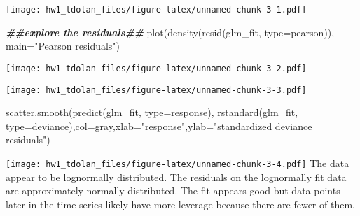 \documentclass[
]{article}
\newenvironment{Shaded}{\begin{snugshade}}{\end{snugshade}}
\newcommand{\AttributeTok}[1]{\textcolor[rgb]{0.77,0.63,0.00}{#1}}
\newcommand{\DocumentationTok}[1]{\textcolor[rgb]{0.56,0.35,0.01}{\textbf{\textit{#1}}}}
\newcommand{\FunctionTok}[1]{\textcolor[rgb]{0.00,0.00,0.00}{#1}}
\newcommand{\NormalTok}[1]{#1}
\newcommand{\SpecialCharTok}[1]{\textcolor[rgb]{0.00,0.00,0.00}{#1}}
\newcommand{\StringTok}[1]{\textcolor[rgb]{0.31,0.60,0.02}{#1}}
\begin{document}
\texttt{[image: hw1\_tdolan\_files/figure-latex/unnamed-chunk-3-1.pdf]}

\begin{Shaded}
\begin{Highlighting}[]
\DocumentationTok{\#\#explore the residuals\#\#}
 \FunctionTok{plot}\NormalTok{(}\FunctionTok{density}\NormalTok{(}\FunctionTok{resid}\NormalTok{(glm\_fit, }\AttributeTok{type=}\StringTok{\textquotesingle{}pearson\textquotesingle{}}\NormalTok{)), }\AttributeTok{main=}\StringTok{"Pearson residuals"}\NormalTok{)}
\end{Highlighting}
\end{Shaded}

\texttt{[image: hw1\_tdolan\_files/figure-latex/unnamed-chunk-3-2.pdf]}

\begin{Shaded}
\end{Shaded}

\texttt{[image: hw1\_tdolan\_files/figure-latex/unnamed-chunk-3-3.pdf]}

\begin{Shaded}
\begin{Highlighting}[]
 \FunctionTok{scatter.smooth}\NormalTok{(}\FunctionTok{predict}\NormalTok{(glm\_fit, }\AttributeTok{type=}\StringTok{\textquotesingle{}response\textquotesingle{}}\NormalTok{), }\FunctionTok{rstandard}\NormalTok{(glm\_fit, }\AttributeTok{type=}\StringTok{\textquotesingle{}deviance\textquotesingle{}}\NormalTok{),}\AttributeTok{col=}\StringTok{\textquotesingle{}gray\textquotesingle{}}\NormalTok{,}\AttributeTok{xlab=}\StringTok{"response"}\NormalTok{,}\AttributeTok{ylab=}\StringTok{"standardized deviance residuals"}\NormalTok{)}
\end{Highlighting}
\end{Shaded}

\texttt{[image: hw1\_tdolan\_files/figure-latex/unnamed-chunk-3-4.pdf]}
The data appear to be lognormally distributed. The residuals on the
lognormally fit data are approximately normally distributed. The fit
appears good but data points later in the time series likely have more
leverage because there are fewer of them.
\end{document}
